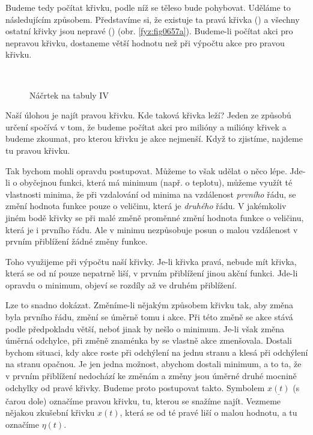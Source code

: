     
    Budeme tedy počítat křivku, podle níž se těleso bude pohybovat. Uděláme to následujícím
    způsobem. Představíme si, že existuje ta pravá křivka () a všechny ostatní křivky
    jsou nepravé () (obr. \ref{fyz:fig0657a}). Budeme-li počítat akci pro nepravou
    křivku, dostaneme větší hodnotu než při výpočtu akce pro pravou křivku.

    \begin{figure}[ht!]
      \centering
        \\
      \caption{Náčrtek na tabuly IV}
      \label{fyz:fig0657}
    \end{figure}
    
    Naší úlohou je najít pravou křivku. Kde taková křivka leží? Jeden ze způsobů určení spočívá v
    tom, že budeme počítat akci pro milióny a milióny křivek a budeme zkoumat, pro kterou křivku je
    akce nejmenší. Když to zjistíme, najdeme tu pravou křivku.

    Tak bychom mohli opravdu postupovat. Můžeme to však udělat o něco lépe. Jde-li o obyčejnou
    funkci, která má minimum (např. o teplotu), můžeme využít té vlastnosti minima, že při
    vzdalování od minima na vzdálenost \emph{prvního} řádu, se změní hodnota funkce pouze o
    veličinu, která je \emph{druhého} řádu. V jakémkoliv jiném bodě křivky se při malé změně
    proměnné změní hodnota funkce o veličinu, která je i prvního řádu. Ale v minimu nezpůsobuje
    posun o malou vzdálenost v prvním přiblížení žádné změny funkce.

    Toho využijeme při výpočtu naší křivky. Je-li křivka pravá, nebude mít křivka, která se od ní
    pouze nepatrně liší, v prvním přiblížení jinou akční funkci. Jde-li opravdu o minimum, objeví se
    rozdíly až ve druhém přiblížení.
    
    Lze to snadno dokázat. Změníme-li nějakým způsobem křivku tak, aby změna byla prvního řádu,
    změní se úměrně tomu i akce. Při této změně se akce stává podle předpokladu větší, neboť jinak
    by nešlo o minimum. Je-li však změna úměrná odchylce, při změně znaménka by se vlastně akce
    zmenšovala. Dostali bychom situaci, kdy akce roste při odchýlení na jednu stranu a klesá při
    odchýlení na stranu opačnou. Je jen jedna možnost, abychom dostali minimum, a to ta, že v prvním
    přiblížení nedochází ke změnám a změny jsou úměrné druhé mocnině odchylky od pravé křivky.
    Budeme proto postupovat takto. Symbolem \(\underline{x(t)}\) (s čarou dole) označíme pravou
    křivku, tu, kterou se snažíme najít. Vezmeme nějakou zkušební křivku \(x(t)\), která se od té
    pravé liší o malou hodnotu, a tu označíme \(\eta(t)\).


